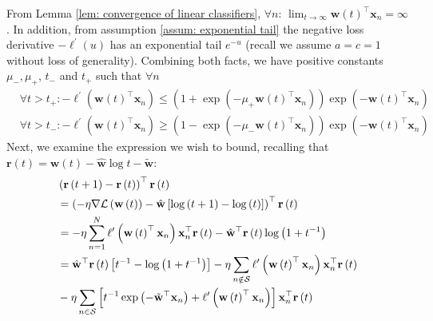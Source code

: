 \documentclass[twoside,11pt,english]{article}
\begin{document}
From Lemma \ref{lem: convergence of linear classifiers}, $\forall n:\,\lim_{t\rightarrow\infty}\mathbf{w}\left(t\right)^{\top}\mathbf{x}_{n}=\infty$.
In addition, from assumption \ref{assum: exponential tail} the negative
loss derivative $-\ell^{\prime}\left(u\right)$ has an exponential
tail $e^{-u}$ (recall we assume $a=c=1$ without loss of generality).
Combining both facts, we have positive constants $\mu_{-},\mu_{+}$,
$t_{-}$ and $t_{+}$ such that $\forall n$ 
\begin{align}
 & \!\!\forall t>t_{+}:-\ell^{\prime}\left(\mathbf{w}\left(t\right)^{\top}\mathbf{x}_{n}\right)\leq\left(1+\exp\left(-\mu_{+}\mathbf{w}\left(t\right)^{\top}\mathbf{x}_{n}\right)\right)\exp\left(-\mathbf{w}\left(t\right)^{\top}\mathbf{x}_{n}\right)\label{eq: exp bound top}\\
 & \!\!\forall t>t_{-}:-\ell^{\prime}\left(\mathbf{w}\left(t\right)^{\top}\mathbf{x}_{n}\right)\geq\left(1-\exp\left(-\mu_{-}\mathbf{w}\left(t\right)^{\top}\mathbf{x}_{n}\right)\right)\exp\left(-\mathbf{w}\left(t\right)^{\top}\mathbf{x}_{n}\right)\label{eq: exp bound bottom}
\end{align}
Next, we examine the expression we wish to bound, recalling that $\mathbf{r}\left(t\right)=\mathbf{w}\left(t\right)-\hat{\mathbf{w}}\log t-\tilde{\mathbf{w}}$:
\begin{align}
 & \left(\mathbf{r}\left(t+1\right)-\mathbf{r}\left(t\right)\right)^{\top}\mathbf{r}\left(t\right)\nonumber \\
 & =\left(-\eta\nabla\mathcal{L}\left(\mathbf{w}\left(t\right)\right)-\hat{\mathbf{w}}\left[\log\left(t+1\right)-\log\left(t\right)\right]\right)^{\top}\mathbf{r}\left(t\right)\nonumber \\
 & =-\eta\sum_{n=1}^{N}\ell^{\prime}\left(\mathbf{w}\left(t\right)^{\top}\mathbf{x}_{n}\right)\mathbf{x}_{n}^{\top}\mathbf{r}\left(t\right)-\hat{\mathbf{w}}^{\top}\mathbf{r}\left(t\right)\log\left(1+t^{-1}\right)\nonumber \\
 & =\hat{\mathbf{w}}^{\top}\mathbf{r}\left(t\right)\left[t^{-1}-\log\left(1+t^{-1}\right)\right]-\eta\sum_{n\notin\mathcal{S}}\ell^{\prime}\left(\mathbf{w}\left(t\right)^{\top}\mathbf{x}_{n}\right)\mathbf{x}_{n}^{\top}\mathbf{r}\left(t\right)\label{eq: norm r dot}\\
 & -\eta\sum_{n\in\mathcal{S}}\left[t^{-1}\exp\left(-\tilde{\mathbf{w}}^{\top}\mathbf{x}_{n}\right)+\ell^{\prime}\left(\mathbf{w}\left(t\right)^{\top}\mathbf{x}_{n}\right)\right]\mathbf{x}_{n}^{\top}\mathbf{r}\left(t\right)\nonumber 
\end{align}
\end{document}
